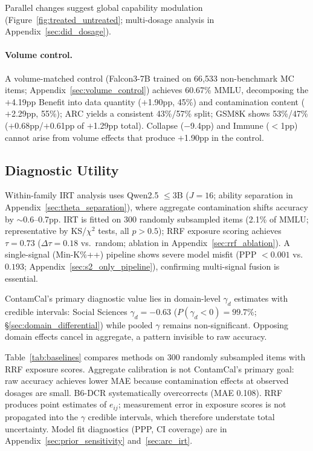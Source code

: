 Parallel changes suggest global capability modulation (Figure~\ref{fig:treated_untreated}; multi-dosage analysis in Appendix~\ref{sec:did_dosage}).

\paragraph{Volume control.}
A volume-matched control (Falcon3-7B trained on 66{,}533 non-benchmark MC items; Appendix~\ref{sec:volume_control}) achieves 60.67\% MMLU, decomposing the $+$4.19pp Benefit into data quantity ($+$1.90pp, 45\%) and contamination content ($+$2.29pp, 55\%); ARC yields a consistent 43\%/57\% split; GSM8K shows 53\%/47\% ($+$0.68pp/$+$0.61pp of $+$1.29pp total). Collapse ($-$9.4pp) and Immune ($<$1pp) cannot arise from volume effects that produce $+$1.90pp in the control.

\subsection{Diagnostic Utility}
\label{sec:calibration_results}

Within-family IRT analysis uses Qwen2.5 $\leq$3B ($J=16$; ability separation in Appendix~\ref{sec:theta_separation}), where aggregate contamination shifts accuracy by ${\sim}$0.6--0.7pp. IRT is fitted on 300 randomly subsampled items (2.1\% of MMLU; representative by KS/$\chi^2$ tests, all $p > 0.5$); RRF exposure scoring achieves $\tau = 0.73$ ($\Delta\tau = 0.18$ vs.\ random; ablation in Appendix~\ref{sec:rrf_ablation}). A single-signal (Min-K\%++) pipeline shows severe model misfit (PPP $< 0.001$ vs.\ $0.193$; Appendix~\ref{sec:s2_only_pipeline}), confirming multi-signal fusion is essential.

ContamCal's primary diagnostic value lies in domain-level $\gamma_d$ estimates with credible intervals: Social Sciences $\gamma_d = -0.63$ ($P(\gamma_d\!<\!0) = 99.7\%$; \S\ref{sec:domain_differential}) while pooled $\gamma$ remains non-significant. Opposing domain effects cancel in aggregate, a pattern invisible to raw accuracy.

Table~\ref{tab:baselines} compares methods on 300 randomly subsampled items with RRF exposure scores. Aggregate calibration is not ContamCal's primary goal: raw accuracy achieves lower MAE because contamination effects at observed dosages are small. B6-DCR systematically overcorrects (MAE 0.108). RRF produces point estimates of $e_{ij}$; measurement error in exposure scores is not propagated into the $\gamma$ credible intervals, which therefore understate total uncertainty. Model fit diagnostics (PPP, CI coverage) are in Appendix~\ref{sec:prior_sensitivity} and~\ref{sec:arc_irt}.

